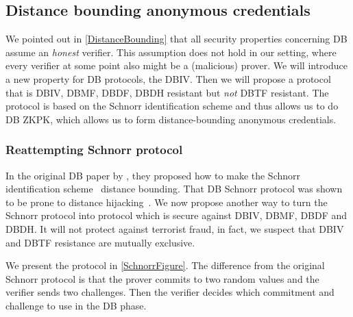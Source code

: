 \subsection{Distance bounding anonymous credentials}%
\label{DB-anon-cred}


We pointed out in \cref{DistanceBounding} that all security properties 
concerning \ac{DB} assume an \emph{honest} verifier.
This assumption does not hold in our setting, where every verifier at some point 
also might be a (malicious) prover.
We will introduce a new property for \ac{DB} protocols, the \ac{DBIV}.
Then we will propose a protocol that is \ac{DBIV}, \ac{DBMF}, \ac{DBDF}, 
\ac{DBDH} resistant but \emph{not} \ac{DBTF} resistant.
The protocol is based on the Schnorr identification scheme and thus allows us to 
do \ac{DB} \ac{ZKPK}, which allows us to form distance-bounding anonymous 
credentials.

\subsubsection{Reattempting  Schnorr protocol}


In the original \ac{DB} paper by \citet{DistanceBounding}, they proposed how to 
make the Schnorr identification scheme~\cite{Schnorr} distance bounding.
That \ac{DB} Schnorr protocol was shown to be prone to distance 
hijacking~\cite{DistanceHijacking}.
We now propose another way to turn the Schnorr protocol into  protocol 
which is secure against \ac{DBIV}, \ac{DBMF}, \ac{DBDF} and \ac{DBDH}.
It will not protect against terrorist fraud, in fact, we suspect that \ac{DBIV} 
and \ac{DBTF} resistance are mutually exclusive.

We present the protocol in \cref{SchnorrFigure}.
The difference from the original Schnorr protocol is that the prover commits to 
two random values and the verifier sends two challenges.
Then the verifier decides which commitment and challenge to use in the \ac{DB} 
phase.

